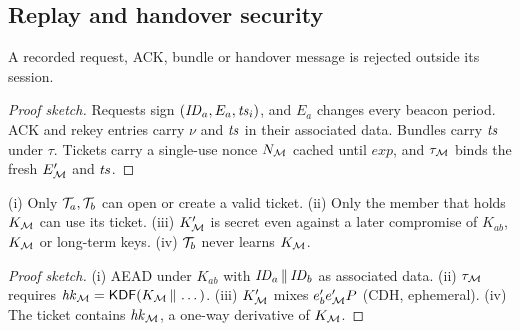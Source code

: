 \subsection{Replay and handover security}
\begin{theorem}\label{thm:replay}
A recorded request, ACK, bundle or handover message is rejected outside its session.
\end{theorem}
\begin{proof}[Proof sketch]
Requests sign $(\mathit{ID}_a,E_a,\mathit{ts}_i)$, and $E_a$ changes every beacon period. ACK and rekey entries carry $\nu$ and $\mathit{ts}$ in their associated data. Bundles carry $\mathit{ts}$ under
$\tau$. Tickets carry a single-use nonce $N_{\mathcal{M}}$ cached until $\mathit{exp}$, and $\tau_{\mathcal{M}}$ binds the fresh $E'_{\mathcal{M}}$ and $\mathit{ts}$.
\end{proof}
\begin{theorem}[Handover]\label{thm:ho}
(i) Only $\mathcal{T}_a,\mathcal{T}_b$ can open or create a valid ticket. (ii) Only the member that holds $K_{\mathcal{M}}$ can use its ticket. (iii) $K'_{\mathcal{M}}$ is secret even against a later compromise
of $K_{ab}$, $K_{\mathcal{M}}$ or long-term keys. (iv) $\mathcal{T}_b$ never learns $K_{\mathcal{M}}$.
\end{theorem}
\begin{proof}[Proof sketch]
(i) AEAD under $K_{ab}$ with $\mathit{ID}_a\,\|\,\mathit{ID}_b$ as associated data. (ii) $\tau_{\mathcal{M}}$ requires $\mathit{hk}_{\mathcal{M}}=\mathsf{KDF}(K_{\mathcal{M}}\,\|\,\dots)$. (iii) $K'_{\mathcal{M}}$ mixes $e'_be'_{\mathcal{M}} P$ (CDH, ephemeral).
(iv) The ticket contains $\mathit{hk}_{\mathcal{M}}$, a one-way derivative of $K_{\mathcal{M}}$.
\end{proof}

